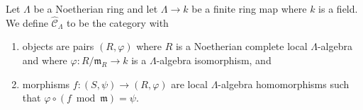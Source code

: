 \begin{definition}
\label{definition-completion-CLambda}
Let $\Lambda$ be a Noetherian ring and let $\Lambda \to k$ be a finite
ring map where $k$ is a field. We define {\it $\widehat{\mathcal{C}}_\Lambda$}
to be the category with
\begin{enumerate}
\item objects are pairs $(R, \varphi)$ where $R$ is a Noetherian complete
local $\Lambda$-algebra and where $\varphi : R/\mathfrak m_R \to k$ is a
$\Lambda$-algebra isomorphism, and
\item morphisms $f : (S, \psi) \to (R, \varphi)$ are local $\Lambda$-algebra
homomorphisms such that $\varphi \circ (f \bmod \mathfrak m) = \psi$.
\end{enumerate}
\end{definition}